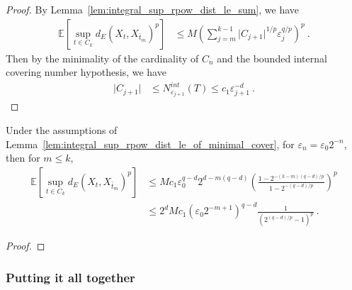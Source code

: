 \begin{proof}
By Lemma~\ref{lem:integral_sup_rpow_dist_le_sum}, we have
\begin{align*}
  \mathbb{E} \left[\sup_{t \in C_k} d_E(X_t, X_{\bar{t}_m})^p \right]
  &\le M \left( \sum_{j=m}^{k-1} \vert C_{j+1} \vert^{1/p} \varepsilon_j^{q/p} \right)^p
  \: .
\end{align*}
Then by the minimality of the cardinality of $C_n$ and the bounded internal covering number hypothesis, we have
\begin{align*}
  \vert C_{j+1} \vert
  &\le N^{int}_{\varepsilon_{j+1}}(T)
  \le c_1 \varepsilon_{j+1}^{-d}
  \: .
\end{align*}
\end{proof}


\begin{corollary}\label{cor:integral_sup_rpow_dist_le_of_minimal_cover_two}
  \leanok
Under the assumptions of Lemma~\ref{lem:integral_sup_rpow_dist_le_of_minimal_cover}, for $\varepsilon_n = \varepsilon_0 2^{-n}$, then for $m \le k$,
\begin{align*}
  \mathbb{E} \left[\sup_{t \in C_k} d_E(X_t, X_{\bar{t}_m})^p \right]
  &\le M c_1 \varepsilon_0^{q - d} 2^{d - m(q-d)}\left( \frac{1 - 2^{- (k - m) (q -d)/p}}{1 - 2^{- (q -d)/p}}\right)^p
  \\
  &\le 2^d M c_1 (\varepsilon_0 2^{-m + 1})^{q - d} \frac{1}{\left( 2^{(q -d)/p} - 1\right)^p}
  \: .
\end{align*}
\end{corollary}

\begin{proof}

\end{proof}



\subsubsection{Putting it all together}

